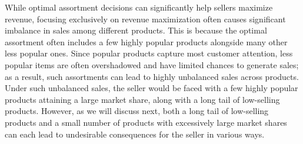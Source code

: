 \documentclass[mnsc,non-blindrev]{informs3}
\theoremstyle{definition}
\begin{document}
{  While optimal assortment decisions can significantly help sellers maximize revenue, focusing exclusively on revenue maximization often causes significant imbalance in sales among different products. This is because the optimal assortment often includes a few highly popular products alongside many other less popular ones. Since popular products capture most customer attention, less popular items are often overshadowed and have limited chances to generate sales; as a result, such assortments can lead to highly unbalanced sales across products. Under such unbalanced sales, the seller would be faced with a few highly popular products attaining a large market share, along with a long tail of low-selling products. However, as we will discuss next, both a long tail of low-selling products and a small number of products with excessively large market shares can each lead to undesirable consequences for the seller in various ways.

}
\end{document}
